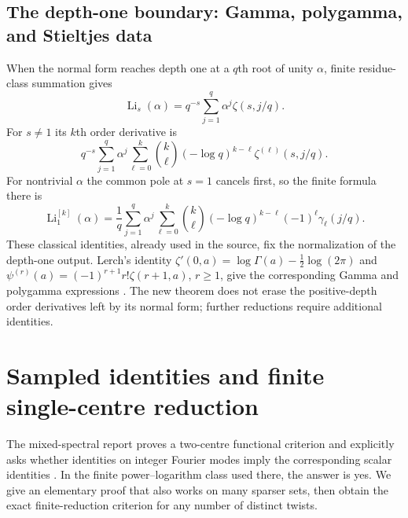 \documentclass[11pt]{article}
\numberwithin{equation}{section}
\theoremstyle{plain}
\theoremstyle{definition}
\theoremstyle{remark}
\DeclareMathOperator{\Li}{Li}
\begin{document}
\subsection{The depth-one boundary: Gamma, polygamma, and Stieltjes data}

When the normal form reaches depth one at a $q$th root of unity
$\alpha$, finite residue-class summation gives
\begin{equation}\label{mixed:DFT}
 \Li_s(\alpha)=q^{-s}\sum_{j=1}^q\alpha^j\zeta(s,j/q).
\end{equation}
For $s\ne1$ its $k$th order derivative is
\begin{equation}\label{mixed:DFTjets}
 q^{-s}\sum_{j=1}^q\alpha^j
  \sum_{\ell=0}^k\binom k\ell(-\log q)^{k-\ell}
                         \zeta^{(\ell)}(s,j/q).
\end{equation}
For nontrivial $\alpha$ the common pole at $s=1$ cancels first,
so the finite formula there is
\begin{equation}\label{mixed:DFTStieltjes}
 \Li_1^{[k]}(\alpha)=\frac1q\sum_{j=1}^q\alpha^j
  \sum_{\ell=0}^k\binom k\ell(-\log q)^{k-\ell}
                         (-1)^\ell\gamma_\ell(j/q).
\end{equation}
These classical identities, already used in the source, fix the
normalization of the depth-one output. Lerch's identity
$\zeta'(0,a)=\log\Gamma(a)-\tfrac12\log(2\pi)$ and
$\psi^{(r)}(a)=(-1)^{r+1}r!\zeta(r+1,a)$, $r\ge1$, give the corresponding
Gamma and polygamma expressions \cite{DLMFHurwitz}. The new theorem
does not erase the positive-depth order derivatives left by its
normal form; further reductions require additional identities.



\section{Sampled identities and finite single-centre reduction}
\label{sampling:section}

The mixed-spectral report proves a two-centre functional criterion and
explicitly asks whether identities on integer Fourier modes imply the
corresponding scalar identities \cite[Section 6, question on sampled
identities]{RepoMixed}. In the finite power--logarithm class used there,
the answer is yes. We give an elementary proof that also works on many
sparser sets, then obtain the exact finite-reduction criterion for any
number of distinct twists.
\end{document}
